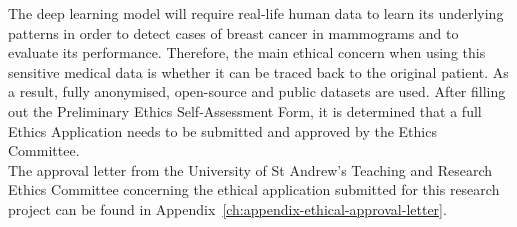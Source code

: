 The deep learning model will require real-life human data to learn its underlying patterns in order to detect cases of breast cancer in mammograms and to evaluate its performance. Therefore, the main ethical concern when using this sensitive medical data is whether it can be traced back to the original patient. As a result, fully anonymised, open-source and public datasets are used. After filling out the Preliminary Ethics Self-Assessment Form, it is determined that a full Ethics Application needs to be submitted and approved by the Ethics Committee.\\

The approval letter from the University of St Andrew's Teaching and Research Ethics Committee concerning the ethical application submitted for this research project can be found in Appendix~\ref{ch:appendix-ethical-approval-letter}.